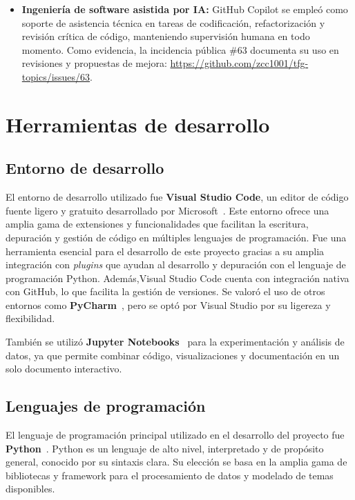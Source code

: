 \begin{itemize}
    \item \textbf{Ingeniería de software asistida por IA:} GitHub Copilot se empleó como soporte de asistencia técnica en tareas de codificación, refactorización y revisión crítica de código, manteniendo supervisión humana en todo momento. Como evidencia, la incidencia pública \#63 documenta su uso en revisiones y propuestas de mejora: \url{https://github.com/zcc1001/tfg-topics/issues/63}.
\end{itemize}

\section{Herramientas de desarrollo}

\subsection{Entorno de desarrollo}

El entorno de desarrollo utilizado fue \textbf{Visual Studio Code}, un editor
de código fuente ligero y gratuito desarrollado por
Microsoft~\cite{QueEsVisualStudioCode}. Este entorno ofrece una amplia gama de
extensiones y funcionalidades que facilitan la escritura, depuración y gestión
de código en múltiples lenguajes de programación. Fue una herramienta esencial
para el desarrollo de este proyecto gracias a su amplia integración con
\textit{plugins} que ayudan al desarrollo y depuración con el lenguaje de
programación Python. Además,Visual Studio Code cuenta con integración nativa
con GitHub, lo que facilita la gestión de versiones. Se valoró el uso de otros
entornos como \textbf{PyCharm}~\cite{PyCharmTodoSobre2022}, pero se optó por
Visual Studio por su ligereza y flexibilidad.

También se utilizó \textbf{Jupyter
    Notebooks}~\cite{ProjectJupyterDocumentation} para la experimentación y
análisis de datos, ya que permite combinar código, visualizaciones y
documentación en un solo documento interactivo.

\subsection{Lenguajes de programación}

El lenguaje de programación principal utilizado en el desarrollo del proyecto
fue \textbf{Python}~\cite{31019Documentation}. Python es un lenguaje de alto
nivel, interpretado y de propósito general, conocido por su sintaxis clara. Su
elección se basa en la amplia gama de bibliotecas y \gls{framework} para el
procesamiento de datos y modelado de temas disponibles.
